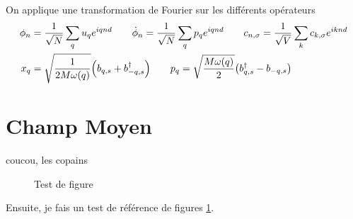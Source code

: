 On applique une transformation de Fourier sur les différents opérateurs
\begin{align*}
        \phi_{n} &=  \frac{1}{\sqrt{N}}\sum_{q}u_q e^{iqnd}\qquad\dot{\phi}_{n}
        =  \frac{1}{\sqrt{N}}\sum_{q}p_q e^{iqnd}\qquad  c_{n,\sigma}
        = \frac{1}{\sqrt{V}}\sum_k c_{k,\sigma} e^{iknd} \\
        x_q &= \sqrt{\frac{1}{2M\omega(q)}}\qty(b_{q,s}+b^\dagger_{-q,s})\qquad
        p_q =\sqrt{\frac{M\omega(q)}{2}}\qty(b_{q,s}^\dagger-b_{-q,s}) \\
\end{align*}
\section{Champ Moyen}
coucou, les copains
\begin{figure}[H]
    \centering
    \caption{Test de figure}
    \label{ttest}
\end{figure}
Ensuite, je fais un test de référence de figures \ref{ttest}.
